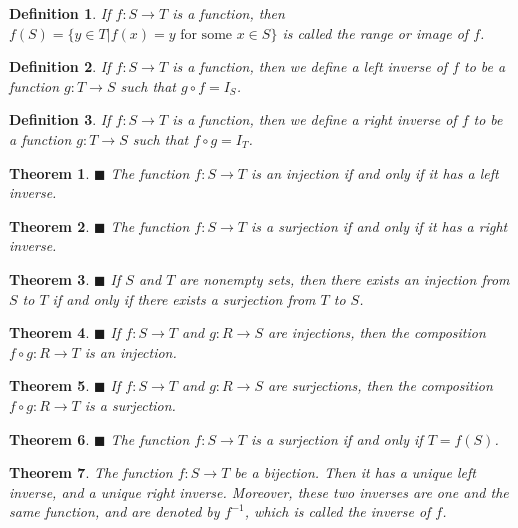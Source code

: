 \documentclass[a4paper]{article}
\newtheorem{mytheorem}{Theorem}
\newtheorem{mydef}{Definition}
\numberwithin{mytheorem}{section}
\numberwithin{mydef}{section}
\numberwithin{axiom}{section}
\numberwithin{example}{section}
\newcommand{\done}{$\blacksquare$ }
\begin{document}
\begin{mydef} If $f: S \rightarrow T$ is a function, then $f(S) = \{ y \in T | f(x) = y \text { for some } x \in S \} $ is called the range or image of $f$.
\end{mydef}

\begin{mydef} If $f: S \rightarrow T$ is a function, then we define a left inverse of $f$ to be a function $g: T \rightarrow S$ such that $g \circ f = I_{S}$. 
\end{mydef}

\begin{mydef} If $f: S \rightarrow T$ is a function, then we define a right inverse of $f$ to be a function $g: T \rightarrow S$ such that $f \circ g = I_{T}$. 
\end{mydef}

\begin{mytheorem} \done The function $f: S \rightarrow T$ is an injection if and only if it has a left inverse.
\end{mytheorem}

\begin{mytheorem} \done The function $f: S \rightarrow T$ is a surjection if and only if it has a right inverse.
\end{mytheorem}

\begin{mytheorem} \done If $S$ and $T$ are nonempty sets, then there exists an injection from $S$ to $T$ if and only if there exists a surjection from $T$ to $S$.
\end{mytheorem}

\begin{mytheorem} \done If $f: S \rightarrow T$ and $g: R \rightarrow S$ are injections, then the composition $f \circ g: R \rightarrow T$ is an injection.
\end{mytheorem}

\begin{mytheorem} \done If $f: S \rightarrow T$ and $g: R \rightarrow S$ are surjections, then the composition $f \circ g: R \rightarrow T$ is a surjection.
\end{mytheorem}

\begin{mytheorem} \done The function $f: S \rightarrow T$ is a surjection if and only if $T = f(S)$. \end{mytheorem}

\begin{mytheorem} The function $f: S \rightarrow T$ be a bijection. Then it has a unique left inverse, and a unique right inverse. Moreover, these two inverses are one and the same function, and are denoted by $f^{-1}$, which is called the inverse of $f$. \end{mytheorem}
\end{document}
